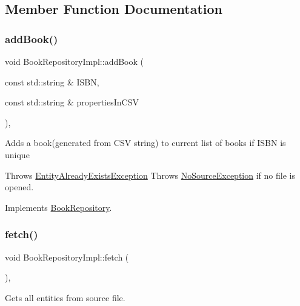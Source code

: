 \subsection{Member Function Documentation}
\mbox{\label{classBookRepositoryImpl_a8b9d7df06f6ab11efd72cb32cbfb52fe}} 
\subsubsection{\texorpdfstring{add\+Book()}{addBook()}}
{\footnotesize\ttfamily void Book\+Repository\+Impl\+::add\+Book (\begin{DoxyParamCaption}\item[{const std\+::string \&}]{I\+S\+BN,  }\item[{const std\+::string \&}]{properties\+In\+C\+SV }\end{DoxyParamCaption})\hspace{0.3cm}{\ttfamily [override]}, {\ttfamily [virtual]}}

Adds a book(generated from C\+S\+V string) to current list of books if I\+S\+BN is unique

Throws \hyperlink{structEntityAlreadyExistsException}{Entity\+Already\+Exists\+Exception} Throws \hyperlink{structNoSourceException}{No\+Source\+Exception} if no file is opened. 

Implements \hyperlink{classBookRepository_a3147ce44d65a78bf2c2480639811a55c}{Book\+Repository}.

\mbox{\label{classBookRepositoryImpl_aec9b4797e9153c1088c7e4a6659124be}} 
\subsubsection{\texorpdfstring{fetch()}{fetch()}}
{\footnotesize\ttfamily void Book\+Repository\+Impl\+::fetch (\begin{DoxyParamCaption}{ }\end{DoxyParamCaption})\hspace{0.3cm}{\ttfamily [override]}, {\ttfamily [virtual]}}

Gets all entities from source file.

